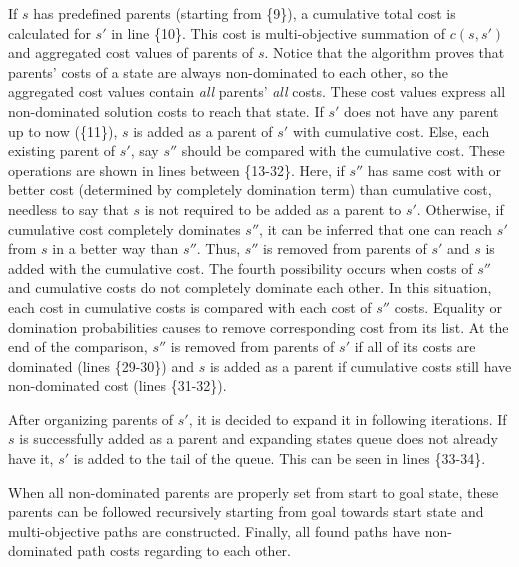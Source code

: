 \documentclass[10pt,journal]{IEEEtran}
\begin{document}
If $s$ has predefined parents (starting from \{9\}), a cumulative total cost is calculated for $s'$ in line \{10\}. This cost is multi-objective summation of $c(s, s')$ and aggregated cost values of parents of $s$. Notice that the algorithm proves that parents' costs of a state are always non-dominated to each other, so the aggregated cost values contain \textit{all} parents' \textit{all} costs. These cost values express all non-dominated solution costs to reach that state. If $s'$ does not have any parent up to now (\{11\}), $s$ is added as a parent of $s'$ with cumulative cost. Else, each existing parent of $s'$, say $s''$ should be compared with the cumulative cost. These operations are shown in lines between \{13-32\}. Here, if $s''$ has same cost with or better cost (determined by completely domination term) than cumulative cost, needless to say that $s$ is not required to be added as a parent to $s'$. Otherwise, if cumulative cost completely dominates $s''$, it can be inferred that one can reach $s'$ from $s$ in a better way than $s''$. Thus, $s''$ is removed from parents of $s'$ and $s$ is added with the cumulative cost. The fourth possibility occurs when costs of $s''$ and cumulative costs do not completely dominate each other. In this situation, each cost in cumulative costs is compared with each cost of $s''$ costs. Equality or domination probabilities causes to remove corresponding cost from its list. At the end of the comparison, $s''$ is removed from parents of $s'$ if all of its costs are dominated (lines \{29-30\}) and $s$ is added as a parent if cumulative costs still have non-dominated cost (lines \{31-32\}).

After organizing parents of $s'$, it is decided to expand it in following iterations. If $s$ is successfully added as a parent and expanding states queue does not already have it, $s'$ is added to the tail of the queue. This can be seen in lines \{33-34\}.

When all non-dominated parents are properly set from start to goal state, these parents can be followed recursively starting from goal towards start state and multi-objective paths are constructed. Finally, all found paths have non-dominated path costs regarding to each other.
\end{document}
